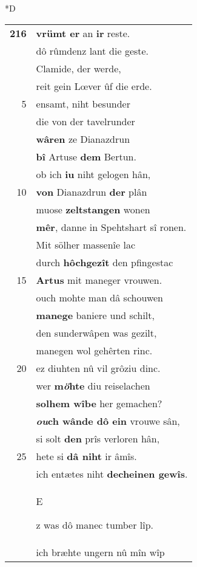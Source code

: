 \documentclass[8pt,a4paper,notitlepage]{article}
\begin{document}
\begin{table}[ht]
\begin{minipage}[t]{0.5\linewidth}
\small
\begin{center}*D
\end{center}
\begin{tabular}{rl}
\textbf{216} & \textbf{vrümt er} an \textbf{ir} reste.\\ 
 & dô rûmdenz lant die geste.\\ 
 & Clamide, der werde,\\ 
 & reit gein Lœver ûf die erde.\\ 
5 & ensamt, niht besunder\\ 
 & die von der tavelrunder\\ 
 & \textbf{wâren} ze Dianazdrun\\ 
 & \textbf{bî} Artuse \textbf{dem} Bertun.\\ 
 & ob ich \textbf{iu} niht gelogen hân,\\ 
10 & \textbf{von} Dianazdrun \textbf{der} plân\\ 
 & muose \textbf{zeltstangen} wonen\\ 
 & \textbf{mêr}, danne in Spehtshart sî ronen.\\ 
 & Mit sölher massenîe lac\\ 
 & durch \textbf{hôchgezît} den pfingestac\\ 
15 & \textbf{Artus} mit maneger vrouwen.\\ 
 & ouch mohte man dâ schouwen\\ 
 & \textbf{manege} baniere und schilt,\\ 
 & den sunderwâpen was gezilt,\\ 
 & manegen wol gehêrten rinc.\\ 
20 & ez diuhten nû vil grôziu dinc.\\ 
 & wer \textbf{m\textit{ö}hte} diu reiselachen\\ 
 & \textbf{solhem wîbe} her gemachen?\\ 
 & \textbf{\textit{ou}ch wânde dô ein} vrouwe sân,\\ 
 & si solt \textbf{den} prîs verloren hân,\\ 
25 & hete si \textbf{dâ niht} ir âmîs.\\ 
 & ich entætes niht \textbf{decheinen gewîs}.\\ 
 & \begin{large}E\end{large}z was dô manec tumber lîp.\\ 
 & ich bræhte ungern nû mîn wîp\\ 

\end{tabular}
\end{minipage}
\end{table}
\end{document}
